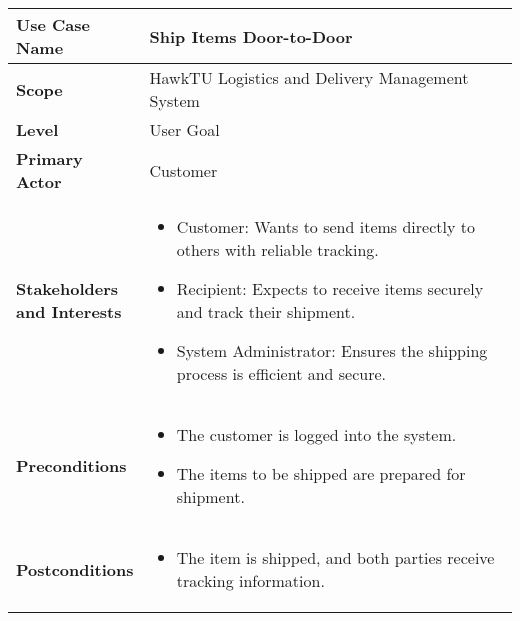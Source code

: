 \documentclass{article}
\begin{document}
\begin{longtable}{|>{\raggedright\arraybackslash}m{0.25\linewidth}|m{0.75\linewidth}|}
\hline
\textbf{Use Case Name} & Ship Items Door-to-Door \\
\hline
\textbf{Scope} & HawkTU Logistics and Delivery Management System \\
\hline
\textbf{Level} & User Goal \\
\hline
\textbf{Primary Actor} & Customer \\ 
\hline
\textbf{Stakeholders and Interests} & 
\begin{itemize}
    \item Customer: Wants to send items directly to others with reliable tracking.
    \item Recipient: Expects to receive items securely and track their shipment.
    \item System Administrator: Ensures the shipping process is efficient and secure.
\end{itemize} \\
\hline
\textbf{Preconditions} & 
\begin{itemize}
    \item The customer is logged into the system.
    \item The items to be shipped are prepared for shipment.
\end{itemize} \\
\hline
\textbf{Postconditions} & 
\begin{itemize}
    \item The item is shipped, and both parties receive tracking information.
\end{itemize} \\
\hline
\end{longtable}

\vspace{-2.45em}
\end{document}

